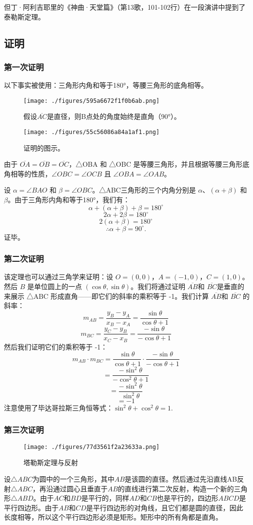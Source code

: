 但丁·阿利吉耶里的《神曲·天堂篇》（第13歌，101-102行）在一段演讲中提到了泰勒斯定理。
\subsection{证明}  
\subsubsection{第一次证明}  
以下事实被使用：三角形内角和等于180°，等腰三角形的底角相等。
\begin{figure}[ht]
\centering
\texttt{[image: ./figures/595a6672f1f0b6ab.png]}
\caption{假设\(\overline{AC}\)是直径，则B点处的角度始终是直角（90°）。} \label{fig_Thales_3}
\end{figure}
\begin{figure}[ht]
\centering
\texttt{[image: ./figures/55c56086a84a1af1.png]}
\caption{证明的图示。} \label{fig_Thales_4}
\end{figure}
由于 \(\overline{OA} = \overline{OB} = \overline{OC}\)，△OBA 和 △OBC 是等腰三角形，并且根据等腰三角形底角相等的性质，\(\angle OBC= \angle OCB\) 且 \(\angle OBA = \angle OAB\)。

设 \(\alpha = \angle BAO\) 和 \(\beta = \angle OBC\)。△ABC三角形的三个内角分别是 \(\alpha\)、\((\alpha + \beta)\) 和 \(\beta\)。由于三角形内角和等于180°，我们有：
\[
\alpha + (\alpha + \beta) + \beta = 180^\circ~
\]
\[
2\alpha + 2\beta = 180^\circ~
\]
\[
2(\alpha + \beta) = 180^\circ~
\]
\[
\therefore \alpha + \beta = 90^\circ.~
\]
证毕。
\subsubsection{第二次证明}  
该定理也可以通过三角学来证明：设 \( O = (0, 0) \)，\( A = (-1, 0) \)，\( C = (1, 0) \)。然后 \( B \) 是单位圆上的一点 \((\cos \theta, \sin \theta)\)。我们将通过证明 \(\overline{AB}\)和 \(\overline{BC}\)是垂直的来展示 △ABC 形成直角——即它们的斜率的乘积等于 -1。我们计算 \(\overline{AB}\)和 \(\overline{BC}\) 的斜率：
\[
m_{AB} = \frac{y_B - y_A}{x_B - x_A} = \frac{\sin \theta}{\cos \theta + 1}~
\]
\[
m_{BC} = \frac{y_C - y_B}{x_C - x_B} = \frac{-\sin \theta}{-\cos \theta + 1}~
\]
然后我们证明它们的乘积等于 -1：
\[
m_{AB} \cdot m_{BC} = \frac{\sin \theta}{\cos \theta + 1} \cdot \frac{-\sin \theta}{-\cos \theta + 1}~
\]
\[
= \frac{-\sin^2 \theta}{-\cos^2 \theta + 1}~
\]
\[
= \frac{-\sin^2 \theta}{\sin^2 \theta}~
\]
\[
= -1~
\]
注意使用了毕达哥拉斯三角恒等式：\(\sin^2 \theta + \cos^2 \theta = 1\).
\subsubsection{第三次证明}
\begin{figure}[ht]
\centering
\texttt{[image: ./figures/77d3561f2a23633a.png]}
\caption{塔勒斯定理与反射} \label{fig_Thales_5}
\end{figure}
设\(\triangle ABC\)为圆中的一个三角形，其中\(AB\)是该圆的直径。然后通过先沿直线AB反射\(\triangle ABC\)，再沿通过圆心且垂直于\(AB\)的直线进行第二次反射，构造一个新的三角形\(\triangle ABD\)。由于\(AC\)和\(BD\)是平行的，同样\(AD\)和\(CB\)也是平行的，四边形\(ABCD\)是平行四边形。由于\(AB\)和\(CD\)是平行四边形的对角线，且它们都是圆的直径，因此长度相等，所以这个平行四边形必须是矩形。矩形中的所有角都是直角。